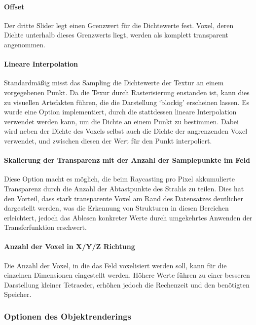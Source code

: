 \documentclass[a4paper,fontsize=12pt,toc=bib,halfparskip]{scrartcl}
\begin{document}
\paragraph{Offset}
Der dritte Slider legt einen Grenzwert f\"ur die Dichtewerte fest. Voxel, deren Dichte unterhalb dieses Grenzwerts liegt, werden als komplett transparent angenommen.

\paragraph{Lineare Interpolation}
Standardm\"a{\ss}ig misst das Sampling die Dichtewerte der Textur an einem vorgegebenen Punkt. Da die Texur durch Rasterisierung enstanden ist, kann dies zu visuellen Artefakten f\"uhren, die die Darstellung `blockig' erscheinen lassen. Es wurde eine Option implementiert, durch die stattdessen lineare Interpolation verwendet werden kann, um die Dichte an einem Punkt zu bestimmen. Dabei wird neben der Dichte des Voxels selbst auch die Dichte der angrenzenden Voxel verwendet, und zwischen diesen der Wert f\"ur den Punkt interpoliert.

\paragraph{Skalierung der Transparenz mit der Anzahl der Samplepunkte im Feld}
Diese Option macht es m\"oglich, die beim Raycasting pro Pixel akkumulierte Transparenz durch die Anzahl der Abtastpunkte des Strahls zu teilen. Dies hat den Vorteil, dass stark transparente Voxel am Rand des Datensatzes deutlicher dargestellt werden, was die Erkennung von Strukturen in diesen Bereichen erleichtert, jedoch das Ablesen konkreter Werte durch umgekehrtes Anwenden der Transferfunktion erschwert.

\paragraph{Anzahl der Voxel in X/Y/Z Richtung}
Die Anzahl der Voxel, in die das Feld voxelisiert werden soll, kann f\"ur die einzelnen Dimensionen eingestellt werden. H\"ohere Werte f\"uhren zu einer besseren Darstellung kleiner Tetraeder, erh\"ohen jedoch die Rechenzeit und den ben\"otigten Speicher.

\subsubsection{Optionen des Objektrenderings}
\end{document}
